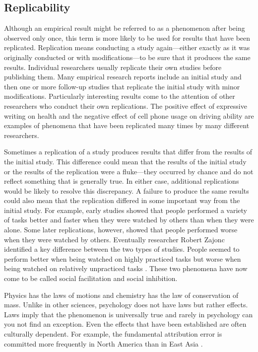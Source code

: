  \subsection{Replicability}
 Although an empirical result might be referred to as a phenomenon after being observed only once, this term is more likely to be used for results that have been replicated. Replication means conducting a study again---either exactly as it was originally conducted or with modifications---to be sure that it produces the same results. Individual researchers usually replicate their own studies before publishing them. Many empirical research reports include an initial study and then one or more follow-up studies that replicate the initial study with minor modifications. Particularly interesting results come to the attention of other researchers who conduct their own replications. The positive effect of expressive writing on health and the negative effect of cell phone usage on driving ability are examples of phenomena that have been replicated many times by many different researchers.
 
 Sometimes a replication of a study produces results that differ from the results of the initial study. This difference could mean that the results of the initial study or the results of the replication were a fluke---they occurred by chance and do not reflect something that is generally true. In either case, additional replications would be likely to resolve this discrepancy. A failure to produce the same results could also mean that the replication differed in some important way from the initial study. For example, early studies showed that people performed a variety of tasks better and faster when they were watched by others than when they were alone. Some later replications, however, showed that people performed worse when they were watched by others. Eventually researcher Robert Zajonc identified a key difference between the two types of studies. People seemed to perform better when being watched on highly practiced tasks but worse when being watched on relatively unpracticed tasks \citep{zajonc_social_1965}. These two phenomena have now come to be called social facilitation and social inhibition.
 
 Physics has the laws of motions and chemistry has the law of conservation of mass. Unlike in other sciences, psychology does not have laws but rather effects. Laws imply that the phenomenon is universally true and rarely in psychology can you not find an exception. Even the effects that have been established are often culturally dependent. For example, the fundamental attribution error is committed more frequently in North America than in East Asia \citep{miyamoto_cultural_2002}.
 
